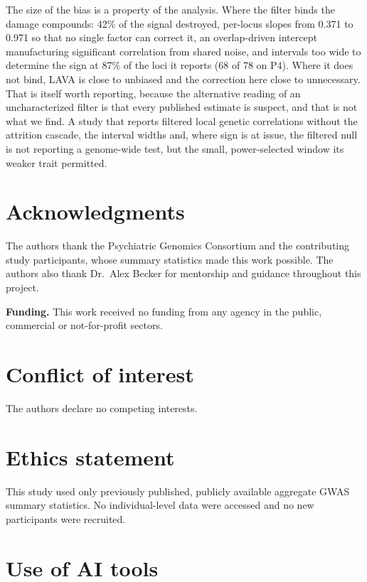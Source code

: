 \documentclass[12pt,a4paper]{article}
\begin{document}
The size of the bias is a property of the analysis. Where the filter
binds the damage compounds: 42\% of the signal destroyed, per-locus slopes from 0.371 to
0.971 so that no single factor can correct it, an overlap-driven intercept manufacturing
significant correlation from shared noise, and intervals too wide to determine the sign at
87\% of the loci it reports (68 of 78 on P4). Where it does not bind, LAVA is close to unbiased and the correction here
close to unnecessary. That is itself worth reporting, because the alternative reading of an
uncharacterized filter is that every published estimate is suspect, and that is not what
we find. A study that reports filtered local genetic correlations without the attrition
cascade, the interval widths and, where sign is at issue, the filtered null is not
reporting a genome-wide test, but the small, power-selected window its weaker trait
permitted.


\section*{Acknowledgments}

The authors thank the Psychiatric Genomics Consortium and the contributing study
participants, whose summary statistics made this work possible. The authors also thank
Dr.\ Alex Becker for mentorship and guidance throughout this project.

\medskip
\noindent\textbf{Funding.} This work received no funding from any agency in the public,
commercial or not-for-profit sectors.

\section*{Conflict of interest}

The authors declare no competing interests.

\section*{Ethics statement}

This study used only previously published, publicly available aggregate GWAS summary
statistics. No individual-level data were accessed and no new participants were recruited.

\section*{Use of AI tools}
\end{document}
